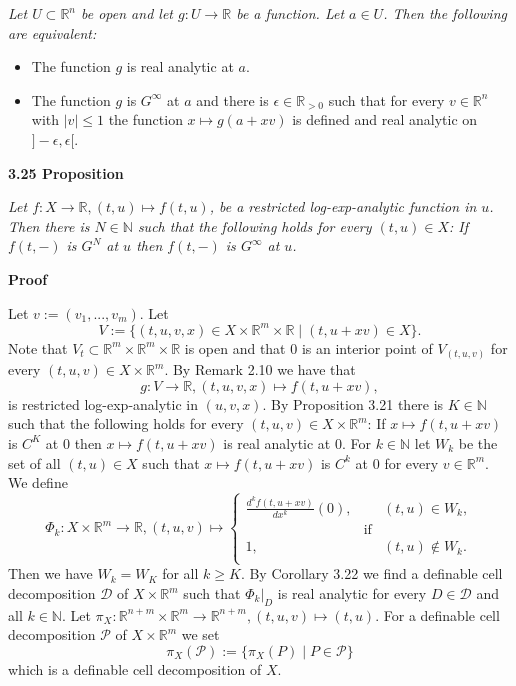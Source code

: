 \documentclass[12pt]{article}
\def\vs{\vspace}
\def\IR{\mathbb R}
\def\ma{\mathcal}
\begin{document}
\vs{0.1cm}
{\it Let $U \subset \mathbb{R}^n$ be open and let $g:U \to \mathbb{R}$ be a function. Let $a \in U$. Then the following are equivalent:
	\begin{itemize}
		\item[(i)] The function $g$ is real analytic at $a$.
		\item[(ii)] The function $g$ is $G^\infty$ at $a$ and there is $\epsilon\in \mathbb{R}_{>0}$ such that for every $v \in \mathbb{R}^n$ with $\vert{v}\vert \leq 1$ the function $x \mapsto g(a+xv)$ is defined and real analytic on $]-\epsilon,\epsilon[$. 
\end{itemize}}

\vs{0.4cm}
{\bf3.25 Proposition}

\vs{0.1cm}
{\it Let $f:X \to \mathbb{R}, (t,u)\mapsto f(t,u)$, be a restricted log-exp-analytic function in $u$. Then there is $N \in \mathbb{N}$ such that the following holds for every $(t,u) \in X$: If $f(t,-)$ is $G^N$ at $u$ then $f(t,-)$ is $G^\infty$ at $u$.}

\vs{0.3cm}
{\bf Proof}

\vs{0.1cm}
Let $v:=(v_1,...,v_m)$. Let 
$$V:=\{(t,u,v,x) \in X \times \mathbb{R}^m \times \mathbb{R} \mid (t,u+xv) \in X\}.$$
Note that $V_t \subset \mathbb{R}^m \times \mathbb{R}^m \times \mathbb{R}$ is open and that $0$ is an interior point of $V_{(t,u,v)}$ for every $(t,u,v) \in X \times \mathbb{R}^m$. By Remark 2.10 we have that
$$g: V \to \mathbb{R}, (t,u,v,x) \mapsto f(t,u+xv),$$
is restricted log-exp-analytic in $(u,v,x)$. By Proposition 3.21  there is $K \in \mathbb{N}$ such that the following holds for every $(t,u,v) \in X \times \mathbb{R}^m$: If $x \mapsto f(t,u+xv)$ is $C^K$ at $0$ then $x \mapsto f(t,u+xv)$ is real analytic at $0$. For $k \in \mathbb{N}$ let $W_k$ be the set of all $(t,u) \in X$ such that $x \mapsto f(t,u+xv)$ is $C^k$ at $0$ for every $v\in \IR^m$.
We define
$$\Phi_k:X \times \IR^m \to \IR,
(t,u,v) \mapsto \left\{\begin{array}{ccc}
\frac{d^kf(t,u+xv)}{dx^k}(0),&&(t,u)\in W_k,\\
&\mbox{if}&\\
1,&&(t,u)\notin W_k.\\
\end{array}\right.$$
Then we have $W_k=W_K$ for all $k \geq K$. By Corollary 3.22 we find a definable cell decomposition $\ma{D}$ of $X \times \mathbb{R}^m$ such that $\Phi_k|_D$ is real analytic for every $D \in \mathcal{D}$ and all $k \in \mathbb{N}$. Let $\pi_X:\mathbb{R}^{n+m} \times \mathbb{R}^m \to \mathbb{R}^{n+m}, (t,u,v) \mapsto (t,u)$. For a definable cell decomposition $\mathcal{P}$ of $X \times \mathbb{R}^m$ we set 
$$\pi_X(\mathcal{P}):=\{\pi_X(P) \mid P \in \mathcal{P}\}$$ 
which is a definable cell decomposition of $X$.
\end{document}
